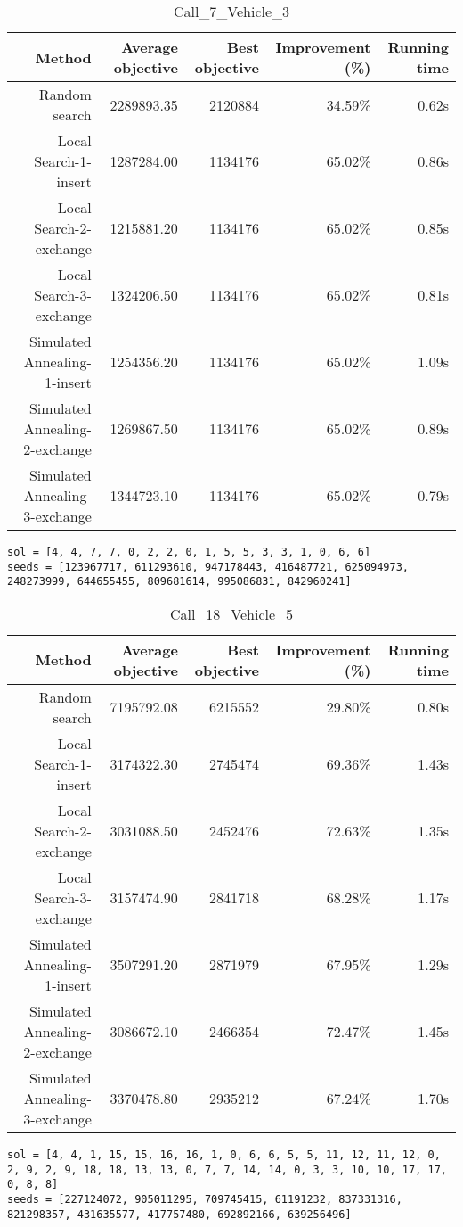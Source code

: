 \begin{table}[ht]
\centering
\caption{Call\_7\_Vehicle\_3}
\label{tab:call7vehicle3}
\begin{tabular}{|r|r|r|r|r|}
Method & Average objective & Best objective & Improvement (\%) & Running time \\
\hline
Random search & 2289893.35 & 2120884 & 34.59\% & 0.62s\\
Local Search-1-insert & 1287284.00 & 1134176 & 65.02\% & 0.86s\\
Local Search-2-exchange & 1215881.20 & 1134176 & 65.02\% & 0.85s\\
Local Search-3-exchange & 1324206.50 & 1134176 & 65.02\% & 0.81s\\
Simulated Annealing-1-insert & 1254356.20 & 1134176 & 65.02\% & 1.09s\\
Simulated Annealing-2-exchange & 1269867.50 & 1134176 & 65.02\% & 0.89s\\
Simulated Annealing-3-exchange & 1344723.10 & 1134176 & 65.02\% & 0.79s\\
\end{tabular}%
\end{table}
\begin{lstlisting}[label={lst:call7vehicle3},caption=Optimal solution call\_7\_vehicle\_3]
sol = [4, 4, 7, 7, 0, 2, 2, 0, 1, 5, 5, 3, 3, 1, 0, 6, 6]
seeds = [123967717, 611293610, 947178443, 416487721, 625094973, 248273999, 644655455, 809681614, 995086831, 842960241]
\end{lstlisting}%
\clearpage


\begin{table}[ht]
\centering
\caption{Call\_18\_Vehicle\_5}
\label{tab:call18vehicle5}
\begin{tabular}{|r|r|r|r|r|}
Method & Average objective & Best objective & Improvement (\%) & Running time \\
\hline
Random search & 7195792.08 & 6215552 & 29.80\% & 0.80s\\
Local Search-1-insert & 3174322.30 & 2745474 & 69.36\% & 1.43s\\
Local Search-2-exchange & 3031088.50 & 2452476 & 72.63\% & 1.35s\\
Local Search-3-exchange & 3157474.90 & 2841718 & 68.28\% & 1.17s\\
Simulated Annealing-1-insert & 3507291.20 & 2871979 & 67.95\% & 1.29s\\
Simulated Annealing-2-exchange & 3086672.10 & 2466354 & 72.47\% & 1.45s\\
Simulated Annealing-3-exchange & 3370478.80 & 2935212 & 67.24\% & 1.70s\\
\end{tabular}%
\end{table}
\begin{lstlisting}[label={lst:call18vehicle5},caption=Optimal solution call\_18\_vehicle\_5]
sol = [4, 4, 1, 15, 15, 16, 16, 1, 0, 6, 6, 5, 5, 11, 12, 11, 12, 0, 2, 9, 2, 9, 18, 18, 13, 13, 0, 7, 7, 14, 14, 0, 3, 3, 10, 10, 17, 17, 0, 8, 8]
seeds = [227124072, 905011295, 709745415, 61191232, 837331316, 821298357, 431635577, 417757480, 692892166, 639256496]
\end{lstlisting}%
\clearpage


